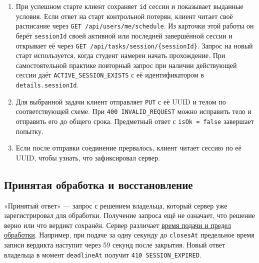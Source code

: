 \documentclass[12pt,a4paper]{article}
\newcommand{\tightlist}{\setlength{\itemsep}{0pt}\setlength{\parskip}{0pt}}
\begin{document}
\hypertarget{как-клиент-проходит-операции}{}

\begin{enumerate}
\def\labelenumi{\arabic{enumi}.}
\tightlist
\item
  При успешном старте клиент сохраняет \texttt{id} сессии и показывает выданные условия. Если ответ на старт контрольной потерян, клиент читает своё расписание через \texttt{GET /\allowbreak{}api/\allowbreak{}users/\allowbreak{}me/\allowbreak{}schedule}. Из карточки этой работы он берёт \texttt{sessionId} своей активной или последней завершённой сессии и открывает её через \texttt{GET /\allowbreak{}api/\allowbreak{}tasks/\allowbreak{}session/\allowbreak{}\{sessionId\}}. Запрос на новый старт используется, когда студент намерен начать прохождение. При самостоятельной практике повторный запрос при наличии действующей сессии даёт \texttt{ACTIVE\_\allowbreak{}SESSION\_\allowbreak{}EXISTS} с её идентификатором в \texttt{details.\allowbreak{}sessionId}.
\item
  Для выбранной задачи клиент отправляет \texttt{PUT} с её UUID и телом по соответствующей схеме. При \texttt{400 INVALID\_\allowbreak{}REQUEST} можно исправить тело и отправить его до общего срока. Предметный ответ с \texttt{isOk\ =\ false} завершает попытку.
\item
  Если после отправки соединение прервалось, клиент читает сессию по её UUID, чтобы узнать, что зафиксировал сервер.
\end{enumerate}

\subsection{Принятая обработка и восстановление}\label{ux43fux440ux438ux43dux44fux442ux430ux44f-ux43eux431ux440ux430ux431ux43eux442ux43aux430-ux438-ux432ux43eux441ux441ux442ux430ux43dux43eux432ux43bux435ux43dux438ux435}

\hypertarget{принятая-обработка-и-восстановление}{}

«Принятый ответ» --- запрос с решением владельца, который сервер уже зарегистрировал для обработки. Получение запроса ещё не означает, что решение верно или что вердикт сохранён. Сервер различает {\hyperlink{время-решения-и-время-обработки}{время подачи и предел обработки}}. Например, при подаче за одну секунду до \texttt{closesAt} предельное время записи вердикта наступит через 59 секунд после закрытия. Новый ответ владельца в момент \texttt{deadlineAt} получит \texttt{410 SESSION\_\allowbreak{}EXPIRED}.
\end{document}
